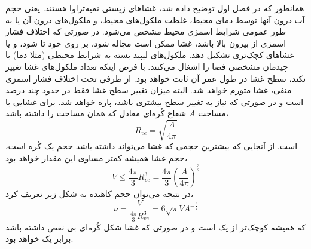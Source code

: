 همانطور که در فصل اول توضیح داده شد، غشاهای زیستی نمیه‌تراوا هستند. یعنی حجم آب درون آنها توسط دمای محیط، غلظت ملکول‌های محیط، و ملکول‌های درون آن یا به طور عمومی شرایط اسمزی محیط مشخص می‌شود. در صورتی که اختلاف فشار اسمزی از بیرون بالا باشد، غشا ممکن است مچاله شود، بر روی خود تا شود، و یا غشا‌های کچک‌تری تشکیل دهد. ملکول‌های لیپید بسته به شرایط محیطی (مثلا دما) با چیدمان مشخصی فضا را اشغال می‌کنند. با فرض اینکه تعداد ملکول‌های غشا تغییر نکند، سطح غشا در طول عمر آن ثابت خواهد بود. از طرفی تحت اختلاف فشار اسمزی منفی، غشا متورم خواهد شد. البته میزان تغییر سطح غشا فقط در حدود چند درصد است و در صورتی که نیاز به تغییر سطح بیشتری باشد، پاره خواهد شد. برای غشایی با مساحت
$A$
شعاع کُره‌ای معادل که همان مساحت را داشته باشد،
\begin{equation}
R_{ve}=\sqrt{\frac{A}{4\pi}}
\end{equation}
است. از آنجایی که بیشترین حجمی که غشا می‌تواند داشته باشد حجم یک کُره‌ است، حجم غشا همیشه کمتر مساوی این مقدار خواهد بود،
\begin{equation}
V\leq\frac{4\pi}{3}R_{ve}^3=\frac{4\pi}{3}\left(\frac{A}{4\pi}\right)^{\frac{3}{2}}
\end{equation}
در نتیجه می‌توان حجم کاهیده به شکل زیر تعریف کرد،
\begin{equation}
\nu=\frac{V}{\frac{4\pi}{3}R_{ve}^3}=6\sqrt{\pi}VA^{-\frac{3}{2}}
\label{eq:reducedVolume}
\end{equation}
که همیشه کوچک‌تر از یک است و در صورتی که غشا شکل کُره‌ای بی نقص داشته باشد برابر یک خواهد بود.
